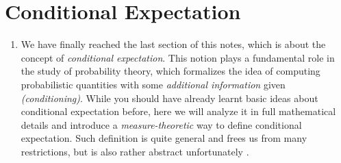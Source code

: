 \section{Conditional Expectation}
\label{sect:cond-exp}
\begin{enumerate}
\item We have finally reached the last section of this notes, which is about
the concept of \emph{conditional expectation}. This notion plays a fundamental
role in the study of probability theory, which formalizes the idea of computing
probabilistic quantities with some \emph{additional information} given
\emph{(conditioning)}. While you should have already learnt basic ideas about
conditional expectation before, here we will analyze it in full mathematical
details and introduce a \emph{measure-theoretic} way to define conditional
expectation. Such definition is quite general and frees us from many
restrictions, but is also rather abstract unfortunately .
\end{enumerate}
